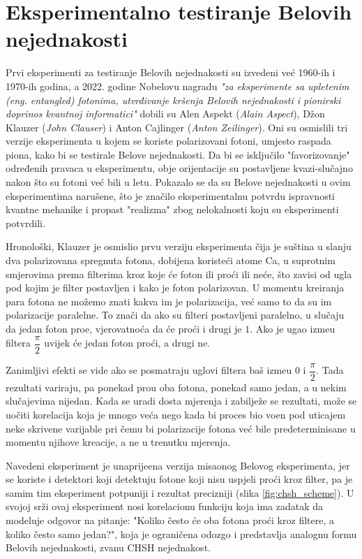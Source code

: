 \chapter{Eksperimentalno testiranje Belovih\\nejednakosti}


Prvi eksperimenti za testiranje Belovih nejednakosti su izvedeni ve\' c 1960-ih i 1970-ih godina, a 2022. godine Nobelovu
nagradu {\it "za eksperimente sa upletenim (eng. entangled) fotonima, utvrđivanje kršenja Belovih nejednakosti i pionirski doprinos kvantnoj informatici"} dobili su
Alen Aspekt (\textit{Alain Aspect}), D\v zon Klauzer (\textit{John Clauser}) i Anton Cajlinger (\textit{Anton Zeilinger}).
Oni su osmislili tri verzije eksperimenta u kojem se koriste polarizovani fotoni, umjesto raspada piona,
kako bi se testirale Belove nejednakosti. Da bi se isklju\v cilo "favorizovanje" određenih pravaca u eksperimentu, obje orijentacije su
postavljene kvazi-slu\v cajno nakon \v sto su fotoni ve\' c bili u letu.
Pokazalo se da su Belove nejednakosti u ovim eksperimentima naru\v sene, \v sto je zna\v cilo eksperimentalnu potvrdu
ispravnosti kvantne mehanike i propast "realizma" zbog nelokalnosti koju su eksperimenti potvrdili.

Hronolo\v ski, Klauzer je osmislio prvu verziju eksperimenta \v cija je 
su\v stina u slanju dva polarizovana spregnuta fotona, dobijena koriste\' ci atome Ca, u suprotnim smjerovima prema filterima kroz koje
\' ce foton ili pro\' ci ili ne\' ce, \v sto zavisi od ugla pod kojim je filter postavljen
i kako je foton polarizovan.
U momentu kreiranja para fotona ne mo\v zemo znati kakva im je polarizacija, ve\' c samo to da su im
polarizacije paralelne. To zna\v ci da ako su filteri postavljeni paralelno, u slu\v caju da jedan foton pro\dj e, vjerovatno\' ca da \' ce pro\' ci i drugi je $1$.
Ako je ugao izme\dj u filtera $\dfrac{\pi}{2}$ uvijek \' ce jedan foton pro\' ci, a drugi ne.

Zanimljivi efekti se vide ako se posmatraju uglovi filtera ba\v s izme\dj u $0$ i $\dfrac{\pi}{2}$. Tada rezultati variraju,
pa ponekad pro\dj u oba fotona, ponekad samo jedan, a u nekim slu\v cajevima nijedan.
Kada se uradi dosta mjerenja i zabilje\v ze se rezultati, mo\v ze se uo\v citi korelacija koja je mnogo ve\'ca nego kada bi
proces bio vo\dj en pod uticajem neke skrivene varijable pri \v cemu bi polarizacije fotona ve\'c bile predeterminisane u momentu njihove kreacije, a ne u trenutku mjerenja.

Navedeni eksperiment je unaprije\dj ena verzija misaonog Belovog eksperimenta, jer se koriste i detektori koji
detektuju fotone koji nisu uspjeli pro\'ci kroz filter, pa je samim tim eksperiment potpuniji i rezultat precizniji (slika \ref{fig:chsh_scheme}).
U svojoj sr\v zi ovaj eksperiment nosi korelacionu funkciju koja ima zadatak da modeluje odgovor na pitanje: "Koliko
\v cesto \'ce oba fotona pro\' ci kroz filtere, a koliko \v cesto samo jedan?", koja je ograni\v cena odozgo i predstavlja analognu formu
Belovih nejednakosti, zvanu CHSH nejednakost.

